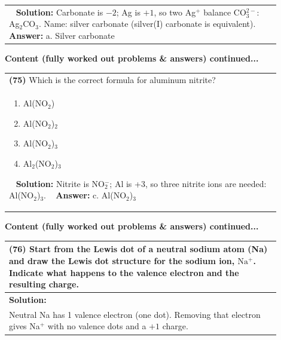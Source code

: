 \documentclass{article}
\begin{document}
{\begin{tabular}{|p{0.9\linewidth}|}
\begin{minipage}[t]{0.85\linewidth}
\end{minipage}\
\hline
\vspace{0.2cm}
\textbf{Solution:} Carbonate is $-2$; Ag is $+1$, so two Ag$^+$ balance CO$_3^{2-}$: Ag$_2$CO$_3$. Name: silver carbonate (silver(I) carbonate is equivalent). \
\hline
\vspace{0.2cm}
\textbf{Answer:} a. Silver carbonate \
\hline
\end{tabular}
\newpage
\noindent
{\large\textbf{Content (fully worked out problems & answers) continued...}}\\[0.2em]
\begin{tabular}{|p{0.9\linewidth}|}
\hline
\vspace{0.2cm}
\textbf{(75)} Which is the correct formula for aluminum nitrite? \\
\begin{minipage}[t]{0.85\linewidth}
\begin{enumerate}[label=\alph*.]
\item Al(NO$_2$) \
\item Al(NO$_2$)$_2$ \
\item Al(NO$_2$)$_3$ \
\item Al$_2$(NO$_2$)$_3$
\end{enumerate}
\end{minipage}\
\hline
\vspace{0.2cm}
\textbf{Solution:} Nitrite is NO$_2^-$; Al is +3, so three nitrite ions are needed: Al(NO$_2$)$_3$. \
\hline
\vspace{0.2cm}
\textbf{Answer:} c. Al(NO$_2$)$_3$ \
\hline
\end{tabular}

\newpage
\noindent
{\large\textbf{Content (fully worked out problems \& answers) continued...}}\\[0.2em]

\vspace{0.2cm}
\begin{tabular}{|p{0.9\linewidth}|}
\hline
\vspace{0.2cm}
\textbf{(76)} Start from the Lewis dot of a neutral sodium atom (Na) and draw the Lewis dot structure for the sodium ion, $\mathrm{Na^{+}}$. Indicate what happens to the valence electron and the resulting charge. \\
\hline
\vspace{0.2cm}
\textbf{Solution:} \\
Neutral Na has 1 valence electron (one dot). Removing that electron gives Na$^+$ with no valence dots and a $+1$ charge. \\



\end{tabular}}
\end{document}
